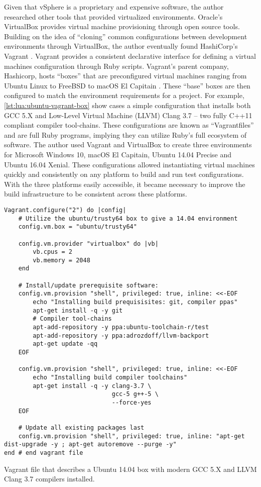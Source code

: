 Given that vSphere is a proprietary and expensive software, the author researched other tools that provided virtualized environments. Oracle's VirtualBox \cite{Oracle:VirtualBox} provides virtual machine provisioning through open source tools. Building on the idea of ``cloning'' common configurations between development environments through VirtualBox, the author eventually found HashiCorp's Vagrant \cite{VagrantUp}. Vagrant provides a consistent declarative interface for defining a virtual machines configuration through Ruby scripts. Vagrant's parent company, Hashicorp, hosts ``boxes'' that are preconfigured virtual machines ranging from Ubuntu Linux to FreeBSD to macOS El Capitain \cite{Vagrant:Boxes}. These ``base'' boxes are then configured to match the environment requirements for a project. For example, \cref{lst:lua:ubuntu-vagrant-box} show cases a simple configuration that installs both GCC 5.X and Low-Level Virtual Machine (LLVM) Clang \cite{LLVM:Clang} 3.7 -- two fully C++11 compliant compiler tool-chains. These configurations are known as ``Vagrantfiles'' and are full Ruby programs, implying they can utilize Ruby's full ecosystem of software. The author used Vagrant and VirtualBox to create three environments for Microsoft Windows 10, macOS El Capitain, Ubuntu 14.04 Precise and Ubuntu 16.04 Xenial. These configurations allowed instantiating virtual machines quickly and consistently on any platform to build and run test configurations. With the three platforms easily accessible, it became necessary to improve the build infrastructure to be consistent across these platforms.

\begin{listing}[tp]
\begin{verbatim}
Vagrant.configure("2") do |config|
    # Utilize the ubuntu/trusty64 box to give a 14.04 environment
    config.vm.box = "ubuntu/trusty64"
    
    config.vm.provider "virtualbox" do |vb|
        vb.cpus = 2
        vb.memory = 2048
    end
    
    # Install/update prerequisite software:
    config.vm.provision "shell", privileged: true, inline: <<-EOF
        echo "Installing build prequisisites: git, compiler ppas"
        apt-get install -q -y git 
        # Compiler tool-chains
        apt-add-repository -y ppa:ubuntu-toolchain-r/test 
        apt-add-repository -y ppa:adrozdoff/llvm-backport 
        apt-get update -qq
    EOF
    
    config.vm.provision "shell", privileged: true, inline: <<-EOF
        echo "Installing build compiler toolchains"
        apt-get install -q -y clang-3.7 \
                              gcc-5 g++-5 \
                              --force-yes
    EOF
    
    # Update all existing packages last
    config.vm.provision "shell", privileged: true, inline: "apt-get dist-upgrade -y ; apt-get autoremove --purge -y"
end # end vagrant file 
\end{verbatim}
\caption{Vagrant file that describes a Ubuntu 14.04 box with modern GCC 5.X and LLVM Clang 3.7 compilers installed.}
\label{lst:lua:ubuntu-vagrant-box}
\end{listing} 


